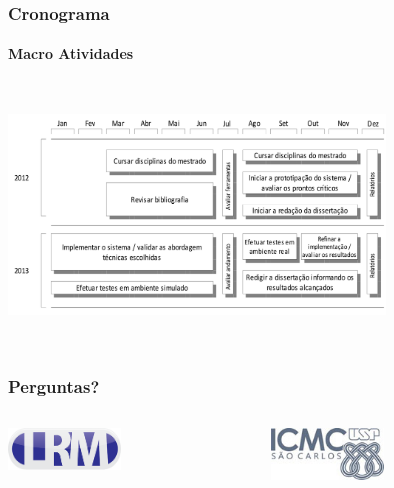 \documentclass[brazil]{beamer}
\begin{document}
\begin{frame}
\frametitle{Cronograma}
\framesubtitle{Macro Atividades}
\includegraphics[width=10cm,height=7cm,]{chrono.png}
\end{frame}


\begin{frame}
\frametitle{Perguntas?}
\centering
\begin{columns}[t]
\begin{column}{4cm}
\includegraphics[width=3cm,keepaspectratio]{logo.png}
\end{column}
\begin{column}{4cm}
\includegraphics[width=3cm,keepaspectratio]{icmc.png}
\end{column}
\end{columns}
\end{frame}
\end{document}
